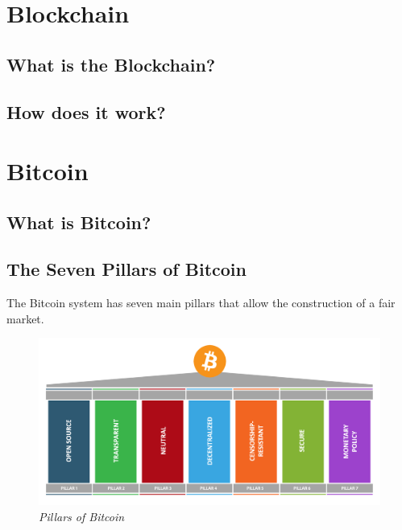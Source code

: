 \documentclass{article}
\newcommand\tab[1][1cm]{\hspace*{#1}}
\begin{document}
\section{Blockchain}

\subsection{What is the Blockchain?}

\subsection{How does it work?}

\section{Bitcoin}

\subsection{What is Bitcoin?}

\subsection{The Seven Pillars of Bitcoin}

\tab The Bitcoin system has seven main pillars that allow the construction of a fair market. 

\begin{figure}[H]
    \begin{center}
        \includegraphics[width=\textwidth]{images/pillars.png}
        \caption{\textit{Pillars of Bitcoin}}
    \end{center}
\end{figure}
\end{document}
